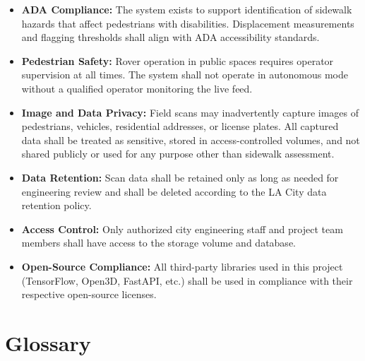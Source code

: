 \documentclass{article}
\begin{document}
\begin{itemize}
  \item \textbf{ADA Compliance:} The system exists to support identification of
    sidewalk hazards that affect pedestrians with disabilities. Displacement
    measurements and flagging thresholds shall align with ADA accessibility standards.
  \item \textbf{Pedestrian Safety:} Rover operation in public spaces requires
    operator supervision at all times. The system shall not operate in autonomous
    mode without a qualified operator monitoring the live feed.
  \item \textbf{Image and Data Privacy:} Field scans may inadvertently capture images
    of pedestrians, vehicles, residential addresses, or license plates. All captured
    data shall be treated as sensitive, stored in access-controlled volumes, and not
    shared publicly or used for any purpose other than sidewalk assessment.
  \item \textbf{Data Retention:} Scan data shall be retained only as long as needed
    for engineering review and shall be deleted according to the LA City data
    retention policy.
  \item \textbf{Access Control:} Only authorized city engineering staff and project
    team members shall have access to the storage volume and database.
  \item \textbf{Open-Source Compliance:} All third-party libraries used in this
    project (TensorFlow, Open3D, FastAPI, etc.) shall be used in compliance with
    their respective open-source licenses.
\end{itemize}


\section{Glossary}
\label{sec:glossary}
\end{document}
